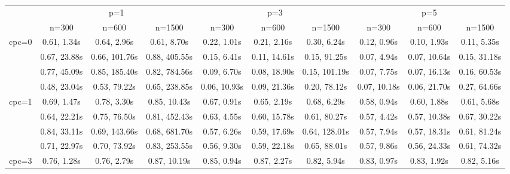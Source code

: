 \documentclass[article]{jss}\usepackage[]{graphicx}\usepackage[]{xcolor}
\begin{document}
\begin{landscape}

  \begin{table}[t!]
    \centering
    \begin{tabular}{@{}cccccccccc@{}}
    \toprule
                           & \multicolumn{3}{c}{p=1}                                            & \multicolumn{3}{c}{p=3}                                            & \multicolumn{3}{c}{p=5}                                            \\
                           & n=300                & n=600                & n=1500               & n=300                & n=600                & n=1500               & n=300                & n=600                & n=1500               \\ \midrule
    \multirow{4}{*}{cpc=0} & 0.61, 1.34s & 0.64, 2.96s & 0.61, 8.70s & 0.22, 1.01s & 0.21, 2.16s & 0.30, 6.24s & 0.12, 0.96s & 0.10, 1.93s & 0.11, 5.35s \\
                           & 0.67, 23.88s & 0.66, 101.76s & 0.88, 405.55s & 0.15, 6.41s & 0.11, 14.61s & 0.15, 91.25s & 0.07, 4.94s & 0.07, 10.64s & 0.15, 31.18s \\
                           & 0.77, 45.09s & 0.85, 185.40s & 0.82, 784.56s & 0.09, 6.70s & 0.08, 18.90s & 0.15, 101.19s & 0.07, 7.75s & 0.07, 16.13s & 0.16, 60.53s \\
                           & 0.48, 23.04s & 0.53, 79.22s & 0.65, 238.85s & 0.06, 10.93s & 0.09, 21.36s & 0.20, 78.12s & 0.07, 10.18s & 0.06, 21.70s & 0.27, 64.66s \\ \midrule
    \multirow{4}{*}{cpc=1} & 0.69, 1.47s & 0.78, 3.30s & 0.85, 10.43s & 0.67, 0.91s & 0.65, 2.19s & 0.68, 6.29s & 0.58, 0.94s & 0.60, 1.88s & 0.61, 5.68s \\
                           & 0.64, 22.21s & 0.75, 76.50s & 0.81, 452.43s & 0.63, 4.55s & 0.60, 15.78s & 0.61, 80.27s & 0.57, 4.42s & 0.57, 10.38s & 0.67, 30.22s \\
                           & 0.84, 33.11s & 0.69, 143.66s & 0.68, 681.70s & 0.57, 6.26s & 0.59, 17.69s & 0.64, 128.01s & 0.57, 7.94s & 0.57, 18.31s & 0.61, 81.24s \\
                           & 0.71, 22.97s & 0.70, 73.92s & 0.83, 253.55s & 0.56, 9.30s & 0.59, 22.18s & 0.65, 88.01s & 0.57, 9.86s & 0.56, 24.33s & 0.61, 74.32s \\ \midrule
    \multirow{4}{*}{cpc=3} & 0.76, 1.28s & 0.76, 2.79s & 0.87, 10.19s & 0.85, 0.94s & 0.87, 2.27s & 0.82, 5.94s & 0.83, 0.97s & 0.83, 1.92s & 0.82, 5.16s \\

\end{tabular}
\end{table}
\end{landscape}
\end{document}
